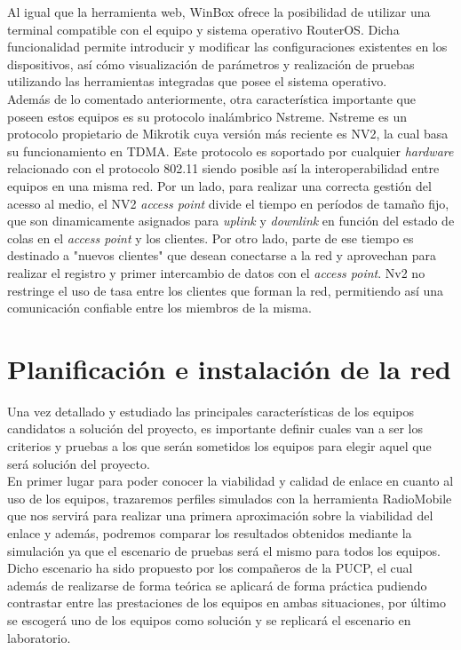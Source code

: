 		Al igual que la herramienta web, WinBox ofrece la posibilidad de utilizar una terminal compatible con el equipo y sistema operativo RouterOS. Dicha funcionalidad permite introducir y modificar las configuraciones existentes en los dispositivos, así cómo visualización de parámetros y realización de pruebas utilizando las herramientas integradas que posee el sistema operativo.\\
		
			Además de lo comentado anteriormente, otra característica importante que poseen estos equipos es su protocolo inalámbrico Nstreme. Nstreme es un protocolo propietario de Mikrotik cuya versión más reciente es NV2, la cual basa su funcionamiento en TDMA. Este protocolo es soportado por cualquier \textit{hardware} relacionado con el protocolo 802.11 siendo posible así la interoperabilidad entre equipos en una misma red. Por un lado, para realizar una correcta gestión del acesso al medio, el NV2 \textit{access point} divide el tiempo en períodos de tamaño fijo, que son dinamicamente asignados para \textit{uplink} y \textit{downlink} en función del estado de colas en el \textit{access point} y los clientes.  Por otro lado, parte de ese tiempo es destinado a "nuevos clientes" que desean conectarse a la red y aprovechan para realizar el registro y primer intercambio de datos con el \textit{access point}. Nv2 no restringe el uso de tasa entre los clientes que forman la red, permitiendo así una comunicación confiable entre los miembros de la misma.
			
\section{Planificación e instalación de la red}
Una vez detallado y estudiado las principales características de los equipos candidatos a solución del proyecto, es importante definir cuales van a ser los criterios y pruebas a los que serán sometidos los equipos para elegir aquel que será solución del proyecto. \\

En primer lugar para poder conocer la viabilidad y calidad de enlace en cuanto al uso de los equipos, trazaremos perfiles simulados con la herramienta RadioMobile que nos servirá para realizar una primera aproximación sobre la viabilidad del enlace y además, podremos comparar los resultados obtenidos mediante la simulación ya que el escenario de pruebas será el mismo para todos los equipos. Dicho escenario ha sido propuesto por los compañeros de la PUCP, el cual además de realizarse de forma teórica se aplicará de forma práctica pudiendo contrastar entre las prestaciones de los equipos en ambas situaciones, por último se escogerá uno de los equipos como solución y se replicará el escenario en laboratorio. \\

